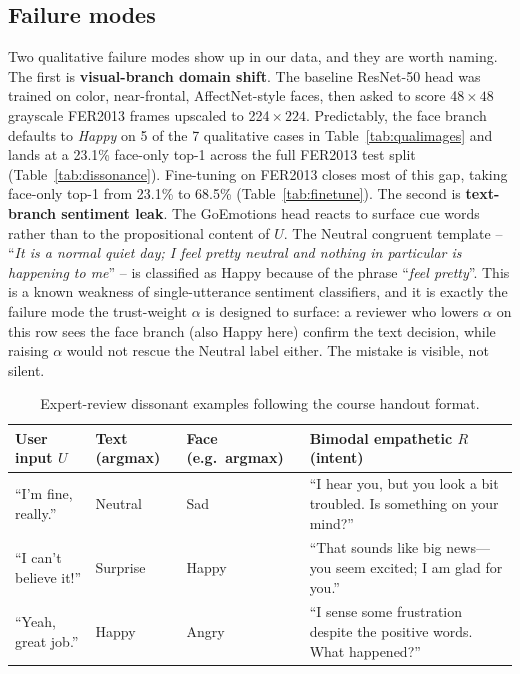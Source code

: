 \documentclass[sigconf,nonacm]{acmart}
\begin{document}
\subsection{Failure modes}\label{sec:failmodes}
Two qualitative failure modes show up in our data, and they are worth naming. The first is \textbf{visual-branch domain shift}. The baseline ResNet-50 head was trained on color, near-frontal, AffectNet-style faces, then asked to score 48$\!\times\!48$ grayscale FER2013 frames upscaled to 224$\!\times\!224$. Predictably, the face branch defaults to \emph{Happy} on 5 of the 7 qualitative cases in Table~\ref{tab:qualimages} and lands at a 23.1\% face-only top-1 across the full FER2013 test split (Table~\ref{tab:dissonance}). Fine-tuning on FER2013 closes most of this gap, taking face-only top-1 from 23.1\% to 68.5\% (Table~\ref{tab:finetune}). The second is \textbf{text-branch sentiment leak}. The GoEmotions head reacts to surface cue words rather than to the propositional content of $U$. The Neutral congruent template -- ``\textit{It is a normal quiet day; I feel pretty neutral and nothing in particular is happening to me}'' -- is classified as Happy because of the phrase ``\textit{feel pretty}''. This is a known weakness of single-utterance sentiment classifiers, and it is exactly the failure mode the trust-weight $\alpha$ is designed to surface: a reviewer who lowers $\alpha$ on this row sees the face branch (also Happy here) confirm the text decision, while raising $\alpha$ would not rescue the Neutral label either. The mistake is visible, not silent.

\begin{table}[!htbp]
  \small
  \centering
  \caption{Expert-review dissonant examples following the course handout format.}
  \label{tab:qual}
  \setlength{\tabcolsep}{4pt}
  \begin{tabular}{@{}p{}p{}p{}p{}@{}}
    \toprule
    User input $U$ & Text (argmax) & Face (e.g.\ argmax) & Bimodal empathetic $R$ (intent) \\
    \midrule
    ``I'm fine, really.'' & Neutral & Sad & ``I hear you, but you look a bit troubled. Is something on your mind?'' \\
    ``I can't believe it!'' & Surprise & Happy & ``That sounds like big news---you seem excited; I am glad for you.'' \\
    ``Yeah, great job.'' & Happy & Angry & ``I sense some frustration despite the positive words. What happened?'' \\
    \bottomrule
  \end{tabular}
\end{table}
\end{document}

